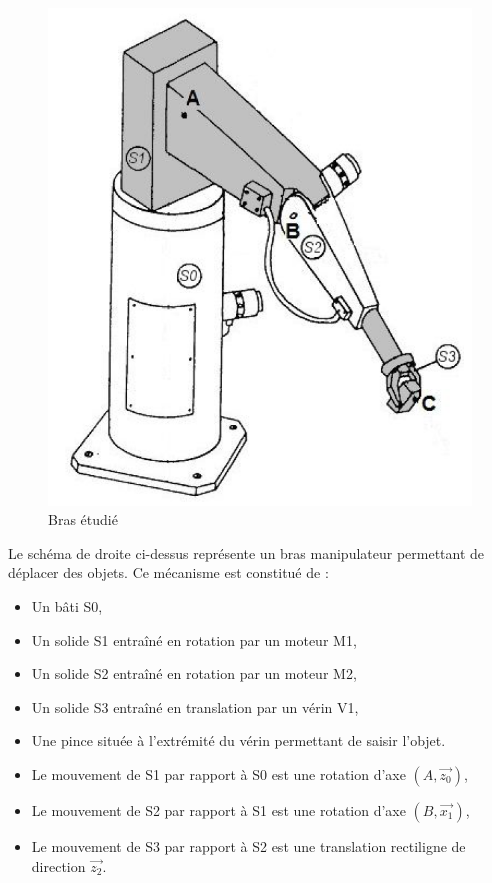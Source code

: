 \begin{figure}[htbp]
\begin{minipage}[c]{.48\linewidth}
\begin{center}
\includegraphics[width=\linewidth]{img/bras.png}
\caption{Bras étudié}
\label{fig:image5}
\end{center}
\end{minipage}
\end{figure}

Le schéma de droite ci-dessus représente un bras manipulateur permettant de déplacer des objets.
Ce mécanisme est constitué de :
\begin{itemize}
 \item Un bâti S0,
 \item Un solide S1 entraîné en rotation par un moteur M1,
 \item Un solide S2 entraîné en rotation par un moteur M2,
 \item Un solide S3 entraîné en translation par un vérin V1,
 \item Une pince située à l'extrémité du vérin permettant de saisir l'objet.
\end{itemize}

\begin{itemize}
 \item Le mouvement de S1 par rapport à S0 est une rotation d'axe $(A, \overrightarrow{z_0})$, 
 \item Le mouvement de S2 par rapport à S1 est une rotation d'axe $(B, \overrightarrow{x_1})$,
 \item Le mouvement de S3 par rapport à S2 est une translation rectiligne de direction $\overrightarrow{z_2}$.
\end{itemize}

